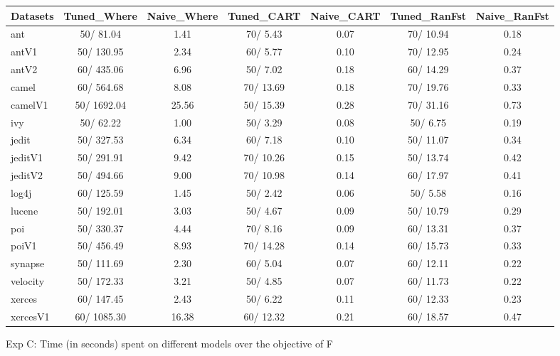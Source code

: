 \documentclass{acm_proc_article-sp}
\begin{document}
\begin{figure*}[!ht]
\scriptsize
\centering
  \begin{tabular}{l|c |c |c |c |c |c }
    \hline\hline
    Datasets & Tuned\_Where & Naive\_Where & Tuned\_CART & Naive\_CART & Tuned\_RanFst & Naive\_RanFst\\
    \hline
    ant & 50/ 81.04 & 1.41 & 70/ 5.43 & 0.07 & 70/ 10.94 & 0.18\\
    antV1 & 50/ 130.95 & 2.34 & 60/ 5.77 & 0.10 & 70/ 12.95 & 0.24\\
    antV2 & 60/ 435.06 & 6.96 & 50/ 7.02 & 0.18 & 60/ 14.29 & 0.37\\
    camel & 60/ 564.68 & 8.08 & 70/ 13.69 & 0.18 & 70/ 19.76 & 0.33\\
    camelV1 & 50/ 1692.04 & 25.56 & 50/ 15.39 & 0.28 & 70/ 31.16 & 0.73\\
    ivy & 50/ 62.22 & 1.00 & 50/ 3.29 & 0.08 & 50/ 6.75 & 0.19\\
    jedit & 50/ 327.53 & 6.34 & 60/ 7.18 & 0.10 & 50/ 11.07 & 0.34\\
    jeditV1 & 50/ 291.91 & 9.42 & 70/ 10.26 & 0.15 & 50/ 13.74 & 0.42\\
    jeditV2 & 50/ 494.66 & 9.00 & 70/ 10.98 & 0.14 & 60/ 17.97 & 0.41\\
    log4j & 60/ 125.59 & 1.45 & 50/ 2.42 & 0.06 & 50/ 5.58 & 0.16\\
    lucene & 50/ 192.01 & 3.03 & 50/ 4.67 & 0.09 & 50/ 10.79 & 0.29\\
    poi & 50/ 330.37 & 4.44 & 70/ 8.16 & 0.09 & 60/ 13.31 & 0.37\\
    poiV1 & 50/ 456.49 & 8.93 & 70/ 14.28 & 0.14 & 60/ 15.73 & 0.33\\
    synapse & 50/ 111.69 & 2.30 & 60/ 5.04 & 0.07 & 60/ 12.11 & 0.22\\
    velocity & 50/ 172.33 & 3.21 & 50/ 4.85 & 0.07 & 60/ 11.73 & 0.22\\
    xerces & 60/ 147.45 & 2.43 & 50/ 6.22 & 0.11 & 60/ 12.33 & 0.23\\
    xercesV1 & 60/ 1085.30 & 16.38 & 60/ 12.32 & 0.21 & 60/ 18.57 & 0.47\\
  \end{tabular}
  \caption{Exp C: Time (in seconds) spent on different models over the objective of F}
\end{figure*}
\end{document}
